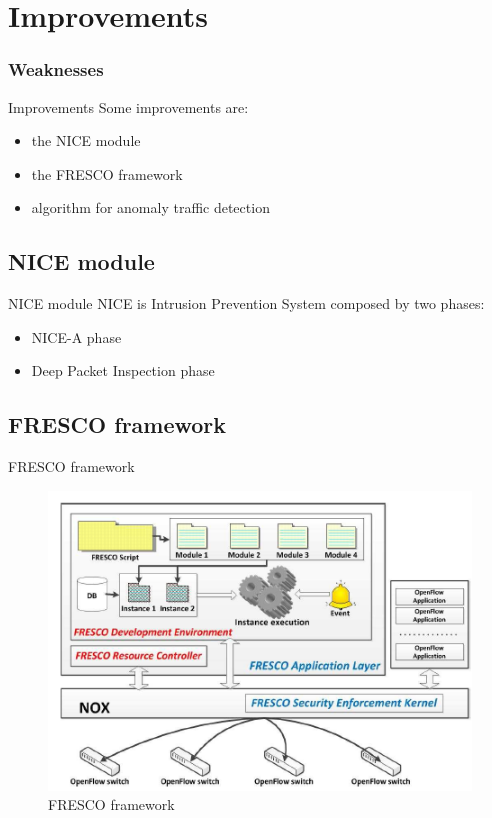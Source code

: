 \section{Improvements}
\frame
{
\frametitle{Weaknesses}
\tableofcontents[currentsection]
\addtocounter{framenumber}{-1}
}

\begin{frame}{Improvements}
Some improvements are:
\begin{itemize}
\item<2-> the NICE module
\item<3-> the FRESCO framework
\item<4-> algorithm for anomaly traffic detection
\end{itemize}
\end{frame}

\subsection{NICE module}
\begin{frame}{NICE module}
NICE is Intrusion Prevention System composed by two phases:
\begin{itemize}
\item<2-> NICE-A phase
\item<3-> Deep Packet Inspection phase
\end{itemize}
\end{frame}

\subsection{FRESCO framework}
\begin{frame}{FRESCO framework}
\begin{figure}
\includegraphics[scale=0.55]{Immagini/FrescoStructure.png}
\caption{FRESCO framework}
\label{fig:FRESCO-framework}
\end{figure}
\end{frame}


